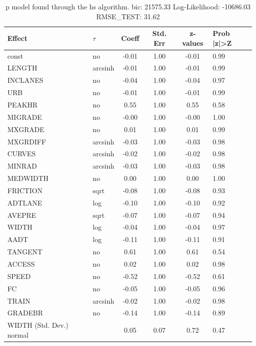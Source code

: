 \begin{table}
	\caption{p model found through the hs algorithm. bic: 21575.33 Log-Likelihood: -10686.03 RMSE_TEST: 31.62}
	\begin{center}
		\begin{tabular}{|l|l|c|c|c|l|}
			\hline
			Effect & $\tau$ & Coeff & Std. Err & z-values & Prob |z|>Z \\
			\hline
			const & no & -0.01 & 1.00 & -0.01 & 0.99 \\
			\hline
			LENGTH & arcsinh & -0.01 & 1.00 & -0.01 & 0.99 \\
			\hline
			INCLANES & no & -0.04 & 1.00 & -0.04 & 0.97 \\
			\hline
			URB & no & -0.01 & 1.00 & -0.01 & 0.99 \\
			\hline
			PEAKHR & no & 0.55 & 1.00 & 0.55 & 0.58 \\
			\hline
			MIGRADE & no & -0.00 & 1.00 & -0.00 & 1.00 \\
			\hline
			MXGRADE & no & 0.01 & 1.00 & 0.01 & 0.99 \\
			\hline
			MXGRDIFF & arcsinh & -0.03 & 1.00 & -0.03 & 0.98 \\
			\hline
			CURVES & arcsinh & -0.02 & 1.00 & -0.02 & 0.98 \\
			\hline
			MINRAD & arcsinh & -0.03 & 1.00 & -0.03 & 0.98 \\
			\hline
			MEDWIDTH & no & 0.00 & 1.00 & 0.00 & 1.00 \\
			\hline
			FRICTION & sqrt & -0.08 & 1.00 & -0.08 & 0.93 \\
			\hline
			ADTLANE & log & -0.10 & 1.00 & -0.10 & 0.92 \\
			\hline
			AVEPRE & sqrt & -0.07 & 1.00 & -0.07 & 0.94 \\
			\hline
			WIDTH & log & -0.04 & 1.00 & -0.04 & 0.97 \\
			\hline
			AADT & log & -0.11 & 1.00 & -0.11 & 0.91 \\
			\hline
			TANGENT & no & 0.61 & 1.00 & 0.61 & 0.54 \\
			\hline
			ACCESS & no & 0.02 & 1.00 & 0.02 & 0.98 \\
			\hline
			SPEED & no & -0.52 & 1.00 & -0.52 & 0.61 \\
			\hline
			FC & no & -0.05 & 1.00 & -0.05 & 0.96 \\
			\hline
			TRAIN & arcsinh & -0.02 & 1.00 & -0.02 & 0.98 \\
			\hline
			GRADEBR & no & -0.14 & 1.00 & -0.14 & 0.89 \\
			\hline
			WIDTH (Std. Dev.) normal &  & 0.05 & 0.07 & 0.72 & 0.47 \\

\end{tabular}
\end{center}
\end{table}
